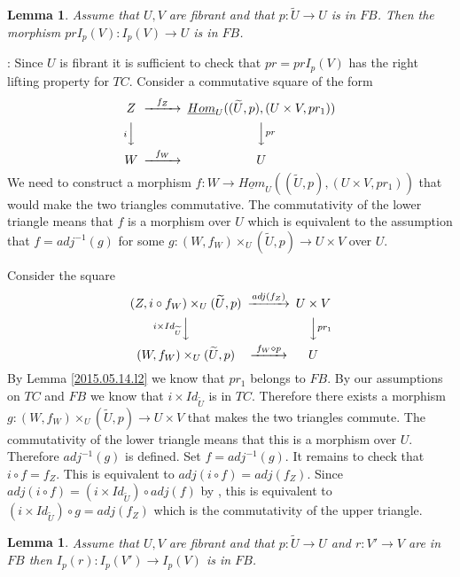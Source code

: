 \documentclass[12pt]{article}
\newenvironment{myproof}{{\bf Proof}:}{\vskip 5mm }
\newtheorem{lemma}[proposition]{Lemma}
\newcommand{\llabel}[1]{\label{#1}}
\newcommand{\sr}{\rightarrow}
\newcommand{\uu}{\underline}
\newcommand{\wt}{\widetilde}
\newcommand{\dd}{\diamond}
\begin{document}
%
\begin{lemma}
\llabel{2015.05.14.l1}
Assume that $U,V$ are fibrant and that $p:\wt{U}\sr U$ is in $FB$. Then the morphism $prI_p(V):I_p(V)\sr U$ is in $FB$.
\end{lemma}
%
\begin{myproof}
Since $U$ is fibrant it is sufficient to check that $pr=prI_p(V)$ has the right lifting property for $TC$. Consider a commutative square of the form
%
$$
\begin{CD}
Z @>f_Z>> \uu{Hom}_U((\wt{U},p),(U\times V,pr_1))\\
@V i VV @VV pr V\\
W @>f_W >> U
\end{CD}
$$
%
We need to construct a morphism $f:W\sr \uu{Hom}_U((\wt{U},p),(U\times V,pr_1))$ that would make the two triangles commutative. The commutativity of the lower triangle means that $f$ is a morphism over $U$ which is equivalent to the assumption that $f=adj^{-1}(g)$ for some $g:(W,f_W)\times_U (\wt{U},p)\sr U\times V$ over $U$.

Consider the square
%
$$
\begin{CD}
(Z, i\circ f_W)\times_U (\wt{U},p) @>adj(f_Z)>> U\times V\\
@V i\times Id_{\wt{U}} VV @VV pr_1 V\\
(W,f_W)\times_U (\wt{U},p) @> f_W\dd p >> U
\end{CD}
$$
%
By Lemma \ref{2015.05.14.l2} we know that $pr_1$ belongs to $FB$. By our assumptions on $TC$ and $FB$ we know that $i\times Id_{\wt{U}}$ is in $TC$. Therefore there exists a morphism  $g:(W,f_W)\times_U (\wt{U},p) \sr U\times V$ that makes the two triangles commute. 
The commutativity of the lower triangle means that this is a morphism over $U$. Therefore $adj^{-1}(g)$ is defined. Set $f=adj^{-1}(g)$. It remains to check that $i\circ f=f_Z$. This is equivalent to $adj(i\circ f)=adj(f_Z)$. Since $adj(i\circ f)=(i\times Id_{\wt{U}})\circ adj(f)$ by \cite[Lemma 8.7(3)]{fromunivwithPi}, this is equivalent to $(i\times Id_{\wt{U}})\circ g=adj(f_Z)$ which is the commutativity of the upper triangle. 
\end{myproof}
%
\begin{lemma}
\llabel{2015.05.14.l3}
Assume that $U,V$ are fibrant and that $p:\wt{U}\sr U$ and $r:V'\sr V$ are in $FB$ then $I_p(r):I_p(V')\sr I_p(V)$ is in $FB$.
\end{lemma}
%
\end{document}
